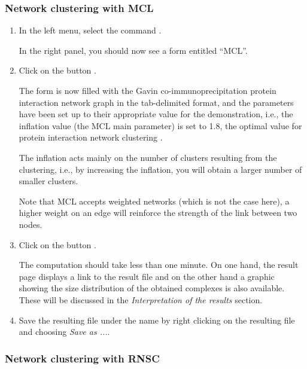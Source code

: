 \subsubsection{Network clustering with MCL}

\begin{enumerate}

\item In the \neat left menu, select the command . 

  In the right panel, you should now see a form entitled
  ``MCL''.

\item Click on the button . 

  The form is now filled with the Gavin co-immunoprecipitation protein interaction network graph in the tab-delimited format, and the parameters have been set up to their appropriate value for the demonstration, i.e., the inflation value (the MCL main parameter) is set to 1.8, the optimal value for  protein interaction network clustering \cite{Brohee2006}. 
  
  The inflation acts mainly on the number of clusters resulting from the clustering, i.e., by increasing the inflation, you will obtain a larger number of smaller clusters.
  
  Note that MCL accepts weighted networks (which is not the case here), a higher weight on an edge will reinforce the strength of the link between two nodes.

\item Click on the button . 

  The computation should take less than one minute. 
  On one hand, the result page displays a link to the result file and on the other hand a graphic showing the size distribution of the obtained complexes is also available. These will be discussed in the \textit{Interpretation of the results} section. 
  
\item Save the resulting file under the name  by right clicking on the resulting file and choosing \textit{Save as ...}.
\end{enumerate}
\subsubsection{Network clustering with RNSC}

